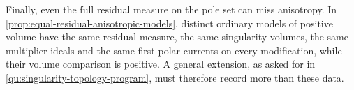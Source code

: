 



Finally, even the full residual measure on the pole set can miss anisotropy. In \cref{prop:equal-residual-anisotropic-models}, distinct ordinary models of positive volume have the same residual measure, the same singularity volumes, the same multiplier ideals and the same first polar currents on every modification, while their volume comparison is positive. A general extension, as asked for in \cref{qu:singularity-topology-program}, must therefore record more than these data.
